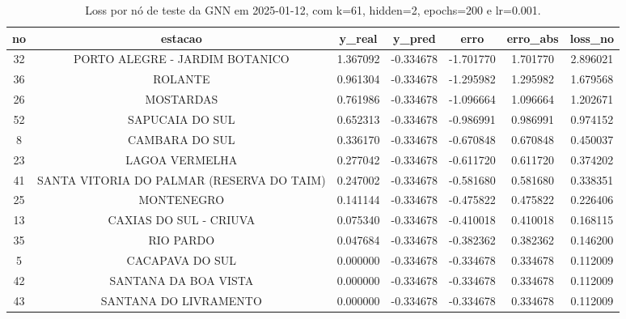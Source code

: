 \begin{table}[h]
\centering
\caption{Loss por nó de teste da GNN em 2025-01-12, com k=61, hidden=2, epochs=200 e lr=0.001.}
\label{tab:gnn_loss_nodes_k61_hidden2}
\begin{tabular}{ccccccc}
\toprule
no & estacao & y\_real & y\_pred & erro & erro\_abs & loss\_no \\
\midrule
32 & PORTO ALEGRE - JARDIM BOTANICO & 1.367092 & -0.334678 & -1.701770 & 1.701770 & 2.896021 \\
36 & ROLANTE & 0.961304 & -0.334678 & -1.295982 & 1.295982 & 1.679568 \\
26 & MOSTARDAS & 0.761986 & -0.334678 & -1.096664 & 1.096664 & 1.202671 \\
52 & SAPUCAIA DO SUL & 0.652313 & -0.334678 & -0.986991 & 0.986991 & 0.974152 \\
8 & CAMBARA DO SUL & 0.336170 & -0.334678 & -0.670848 & 0.670848 & 0.450037 \\
23 & LAGOA VERMELHA & 0.277042 & -0.334678 & -0.611720 & 0.611720 & 0.374202 \\
41 & SANTA VITORIA DO PALMAR (RESERVA DO TAIM) & 0.247002 & -0.334678 & -0.581680 & 0.581680 & 0.338351 \\
25 & MONTENEGRO & 0.141144 & -0.334678 & -0.475822 & 0.475822 & 0.226406 \\
13 & CAXIAS DO SUL - CRIUVA & 0.075340 & -0.334678 & -0.410018 & 0.410018 & 0.168115 \\
35 & RIO PARDO & 0.047684 & -0.334678 & -0.382362 & 0.382362 & 0.146200 \\
5 & CACAPAVA DO SUL & 0.000000 & -0.334678 & -0.334678 & 0.334678 & 0.112009 \\
42 & SANTANA DA BOA VISTA & 0.000000 & -0.334678 & -0.334678 & 0.334678 & 0.112009 \\
43 & SANTANA DO LIVRAMENTO & 0.000000 & -0.334678 & -0.334678 & 0.334678 & 0.112009 \\
\bottomrule
\end{tabular}
\end{table}
